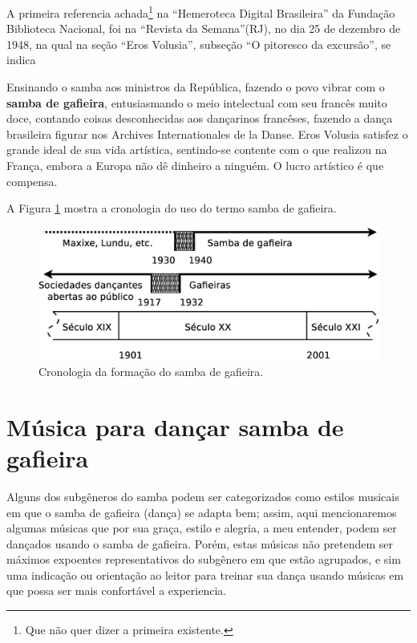 A primeira referencia achada\footnote{Que não quer dizer a primeira existente.} 
na ``Hemeroteca Digital Brasileira'' da Fundação Biblioteca Nacional,
foi na ``Revista da Semana''(RJ), no dia 25 de dezembro de 1948,
na qual na seção ``Eros Volusia'', subseção ``O pitoresco da excursão'', se indica \cite[pp. 48]{sambagafieirarefbn}
\begin{citando}
Ensinando o samba aos ministros da República, 
fazendo o povo vibrar com o \textbf{samba de gafieira}, entusiasmando
o meio intelectual com seu francês muito doce,
contando coisas desconhecidas aos dançarinos francêses,
fazendo a dança brasileira figurar nos Archives Internationales de la Danse.
Eros Volusia satisfez o grande ideal de sua vida artística, sentindo-se contente
com o que realizou na França, embora a Europa não dê dinheiro a ninguém.
O lucro artístico é que compensa.
\end{citando}


A Figura \ref{fig:sambagafieiracrono} mostra a cronologia do uso do termo samba de gafieira. 

\begin{figure}[h]
  \centering
    \includegraphics[width=1.0\textwidth]{chapters/cap-historia-sambagafieira/gafieira-crono.eps}
  \caption{ Cronologia da formação do samba de gafieira.}
\label{fig:sambagafieiracrono}
\end{figure}

\section{Música para dançar samba de gafieira}
\label{subsec:gafieiradancaestilos}

Alguns dos subgêneros do samba podem ser categorizados como estilos musicais em que o samba de gafieira (dança) se adapta bem; 
assim,
aqui mencionaremos algumas músicas que por sua graça, estilo e alegria,
a meu entender, podem ser dançados usando o samba de gafieira. Porém, 
estas músicas não pretendem ser máximos expoentes representativos do subgênero em que estão agrupados,
e sim uma indicação ou orientação ao leitor para treinar sua dança usando músicas em que possa ser mais confortável a experiencia.

